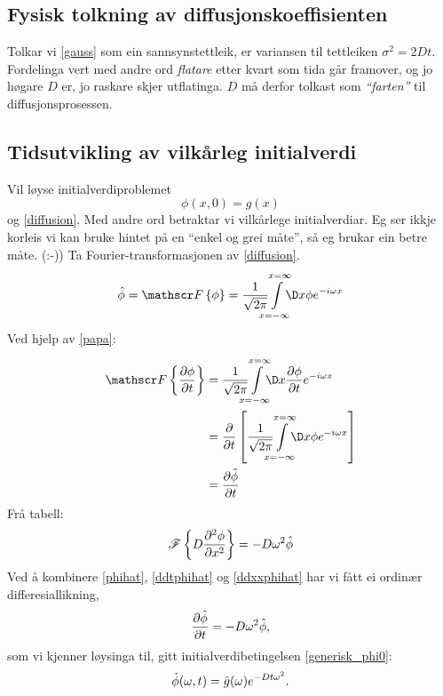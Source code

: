 \documentclass[12pt]{article}
\begin{document}
\begin{multicols*}{2}
    \subsection*{Fysisk tolkning av diffusjonskoeffisienten}
    Tolkar vi \eqref{gauss} som ein sannsynstettleik, er
    variansen til tettleiken $\sigma^2 = 2Dt$.
    Fordelinga vert med andre ord {\em flatare} etter kvart
    som tida går framover, og jo høgare $D$ er, jo raskare
    skjer utflatinga.
    $D$ må derfor tolkast som {\em ``farten''} til diffusjonsprosessen.

    \subsection*{Tidsutvikling av vilkårleg initialverdi}
    Vil løyse initialverdiproblemet
    \begin{equation}
        \phi(x, 0) = g(x)
        \label{generisk_phi0}
    \end{equation}
    og \eqref{diffusion}. Med andre ord betraktar vi vilkårlege
    initialverdiar.
    Eg ser ikkje korleis vi kan bruke hintet på en ``enkel og grei måte'',
    så eg brukar ein betre måte. (:-)) Ta Fourier-transformasjonen av \eqref{diffusion}.
    \begin{equation}
        \label{phihat}
        \hat\phi = \mathscr F\left\{\phi\right\} = \FT{x}{\phi}
    \end{equation}
    Ved hjelp av \eqref{papa}:
    \begin{equation}
        \label{ddtphihat}
        \begin{split}
            \mathscr F \left\{\deldel{\phi}{t}\right\}
                &= \FT{x}{\deldel{\phi}{t}} \\
                &= \deldel{}{t} \left[ \FT{x}{\phi} \right] \\
                &= \deldel{\hat\phi}{t}
        \end{split}
    \end{equation}
    Frå tabell:
    \begin{equation}
        \label{ddxxphihat}
        \mathscr F \left\{D\frac{\partial^{2} \phi}{\partial x ^{2}}\right\} = -D \omega^2 \hat \phi
    \end{equation}
    Ved å kombinere \eqref{phihat}, \eqref{ddtphihat} og \eqref{ddxxphihat}
    har vi fått ei ordinær differesiallikning,
    \[
        \frac{\partial \hat\phi}{\partial t} = -D \omega^2 \hat \phi \text,
    \]
    som vi kjenner løysinga til, gitt initialverdibetingelsen \eqref{generisk_phi0}:
    \[
        \hat \phi(\omega, t) = \hat g(\omega) e^{-Dt\omega^2} \text.
\]
\end{multicols*}
\end{document}

